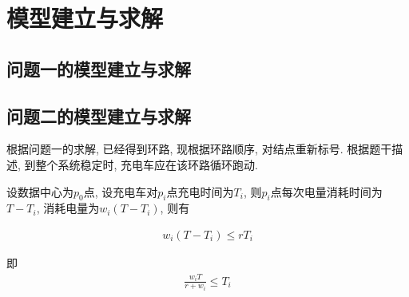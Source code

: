 
\section{模型建立与求解}


\subsection{问题一的模型建立与求解}


\subsection{问题二的模型建立与求解}

根据问题一的求解, 已经得到环路, 现根据环路顺序, 对结点重新标号. 根据题干描述, 到整个系统稳定时, 充电车应在该环路循环跑动.

设数据中心为$p_0$点, 设充电车对$p_i$点充电时间为$T_i$, 则$p_i$点每次电量消耗时间为$T-T_i$, 消耗电量为$w_i(T-T_i)$, 则有

\begin{eqnarray}
w_i(T-T_i) \leq rT_i 
\end{eqnarray}

即
\begin{eqnarray}
\frac{w_iT}{r+w_i} \leq T_i
\end{eqnarray}